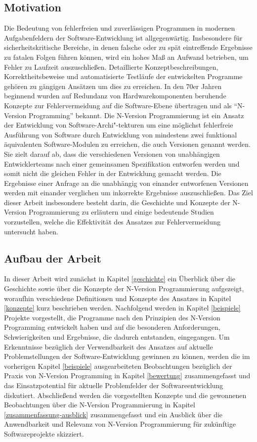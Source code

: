 \subsection{Motivation}\label{motivation}

Die Bedeutung von fehlerfreien und zuverlässigen Programmen in modernen Aufgabenfeldern der Software-Entwicklung ist allgegenwärtig.
Insbesondere für sicherheitskritische Bereiche, in denen falsche oder zu spät eintreffende Ergebnisse zu fatalen Folgen führen können, wird ein hohes Maß an Aufwand betrieben, um Fehler zu Laufzeit auszuschließen.
Detaillierte Konzeptbeschreibungen, Korrektheitsbeweise und automatisierte Testläufe der entwickelten Programme gehören zu gängigen Ansätzen um dies zu erreichen.
In den 70er Jahren beginnend wurden auf Redundanz von Hardwarekomponenten beruhende Konzepte zur Fehlervermeidung auf die Software-Ebene übertragen und als \enquote{N-Version Programming} \cite{Chen1978} bekannt.
Die N-Version Programmierung ist ein Ansatz der Entwicklung von Software-Archi"-tekturen um eine möglichst fehlerfreie Ausführung von Software durch Entwicklung von mindestens zwei funktional äquivalenten Software-Modulen zu erreichen, die auch Versionen genannt werden.
Sie zielt darauf ab, dass die verschiedenen Versionen von unabhängigen Entwicklerteams nach einer gemeinsamen Spezifikation entworfen werden und somit nicht die gleichen Fehler in der Entwicklung gemacht werden.
Die Ergebnisse einer Anfrage an die unabhängig von einander entworfenen Versionen werden mit einander verglichen um inkorrekte Ergebnisse auszuschließen.
Das Ziel dieser Arbeit insbesondere besteht darin, die Geschichte und Konzepte der N-Version Programmierung zu erläutern und einige bedeutende Studien vorzustellen, welche die Effektivität des Ansatzes zur Fehlervermeidung untersucht haben.


\subsection{Aufbau der Arbeit}\label{aufbau}

In dieser Arbeit wird zunächst in Kapitel \ref{geschichte} ein Überblick über die Geschichte sowie über die Konzepte der N-Version Programmierung aufgezeigt, woraufhin verschiedene Definitionen und Konzepte des Ansatzes in Kapitel \ref{konzepte} kurz beschrieben werden. Nachfolgend werden in Kapitel \ref{beispiele} Projekte vorgestellt, die Programme nach den Prinzipien des N-Version Programming entwickelt haben und auf die besonderen Anforderungen, Schwierigkeiten und Ergebnisse, die dadurch entstanden, eingegangen.
Um Erkenntnisse bezüglich der Verwendbarkeit des Ansatzes auf aktuelle Problemstellungen der Software-Entwicklung gewinnen zu können, werden die im vorherigen Kapitel \ref{beispiele} ausgearbeiteten Beobachtungen bezüglich der Praxis von N-Version Programming in Kapitel \ref{bewertung} zusammengefasst und das Einsatzpotential für aktuelle Problemfelder der Softwareentwicklung diskutiert.
Abschließend werden die vorgestellten Konzepte und die gewonnenen Beobachtungen über die N-Version Programmierung in Kapitel \ref{zusammenfassung-ausblick} zusammengefasst und ein Ausblick über die Anwendbarkeit und Relevanz von N-Version Programmierung für zukünftige Softwareprojekte skizziert.